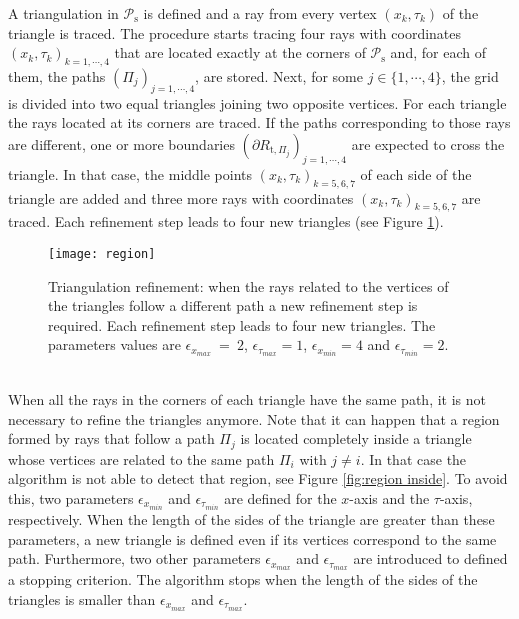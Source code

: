 A triangulation in $\mathcal{P}_\textrm{s}$ is defined and a ray from every vertex $(x_k, \tau_k)$ of the triangle is traced.
The procedure starts tracing four rays with coordinates $(x_k,\tau_k)_{k=1, \cdots, 4}$ that are located exactly at the corners of $\mathcal{P}_\textrm{s}$ and, for each of them, the paths $(\Pi_{j})_{j = 1, \cdots, 4}$, are stored. Next, for some $j \in\{1, \cdots, 4\}$, the grid is divided into two equal triangles joining two opposite vertices. For each triangle the rays located at its corners are traced. If the paths corresponding to
those rays are different, one or more boundaries
$(\partial R_{\textrm{t}, \Pi_j})_{j =1, \cdots, 4}$ are expected to cross the triangle.
In that case, the middle points $(x_k, \tau_k)_{k = 5, 6, 7}$ of each side of the triangle are added and
three more rays with coordinates $(x_k, \tau_k)_{k = 5, 6,7}$ are traced. Each refinement step leads to four new triangles (see Figure \ref{fig:refinement}).
 \begin{figure}[h]
  \begin{center}
  \texttt{[image: region]}
  \end{center}
  \caption{Triangulation refinement:
  when the rays related to the vertices of the triangles follow a different path a new refinement step is required.
   Each refinement step leads to four new triangles.
   The parameters values are $\epsilon_{x_{max}}~=~ 2$, $\epsilon_{\tau_{max}}= 1$, $\epsilon_{x_{min}}= 4$ and $\epsilon_{\tau_{min}}=2$.}
  \label{fig:refinement}
\end{figure}
  \\ \indent
When all the rays in the corners of each triangle have the same path, it is not necessary to refine the triangles anymore.
\noindent Note that it can happen that a region formed by rays that follow a path $\Pi_j$ is located completely inside a triangle whose vertices are related to the same path $\Pi_i$ with $j \neq i$. In that case the algorithm is not able to detect that region, see Figure \ref{fig:region inside}. To avoid this, two parameters $\epsilon_{x_{min}}$ and $\epsilon_{\tau_{min}}$ are defined for the $x$-axis and the $\tau$-axis, respectively. When the length of the sides of the triangle are greater than these parameters, a new triangle is defined even if its vertices correspond to the same path. Furthermore, two other parameters $\epsilon_{x_{max}}$ and $\epsilon_{\tau_{max}}$ are introduced to defined a stopping criterion.
The algorithm stops when the length of the sides of the triangles is smaller than $\epsilon_{x_{max}}$ and $\epsilon_{\tau_{max}}$.
